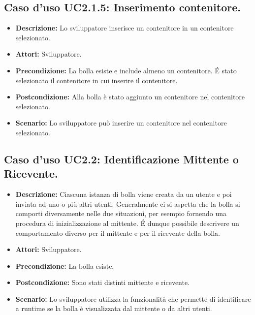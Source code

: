 \subsection{Caso d'uso UC2.1.5: Inserimento contenitore.}
\begin{itemize}
\item[]\textbf{Descrizione:} Lo sviluppatore inserisce  un contenitore in un contenitore selezionato.
\item[]\textbf{Attori:} Sviluppatore. 
\item[]\textbf{Precondizione:} La bolla esiste e include almeno un contenitore. \'E stato
selezionato il contenitore in cui inserire il contenitore. 
\item[]\textbf{Postcondizione:} Alla bolla è stato aggiunto un
contenitore nel contenitore selezionato. 
\item[]\textbf{Scenario:}
Lo sviluppatore può inserire un contenitore nel contenitore selezionato. 
\end{itemize}

\subsection{Caso d'uso UC2.2: Identificazione Mittente o Ricevente.}
\begin{itemize}
\item[]\textbf{Descrizione:} Ciascuna istanza di bolla viene creata da un utente e poi inviata ad uno o più altri utenti. Generalmente ci si aspetta che la bolla si comporti diversamente nelle due situazioni, per esempio fornendo una procedura di inizializzazione al mittente. \'E dunque possibile descrivere un comportamento diverso per il mittente e per il ricevente della bolla.
\item[]\textbf{Attori:} Sviluppatore. 
\item[]\textbf{Precondizione:} La bolla esiste. 
\item[]\textbf{Postcondizione:} Sono stati distinti mittente e ricevente. 
\item[]\textbf{Scenario:}
Lo sviluppatore utilizza la funzionalità che permette di identificare a runtime se la bolla è visualizzata dal mittente o da altri utenti. 
\end{itemize}

\clearpage

